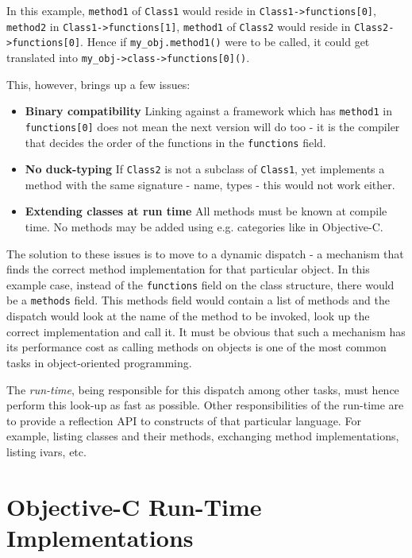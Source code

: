 In this example, \verb=method1= of \verb=Class1= would reside in \verb=Class1->functions[0]=, \verb=method2= in \verb=Class1->functions[1]=, \verb=method1= of \verb=Class2= would reside in \newline{}\verb=Class2->functions[0]=. Hence if \verb=my_obj.method1()= were to be called, it could get translated into \verb=my_obj->class->functions[0]()=.

This, however, brings up a few issues:

\begin{itemize}
  \item{\bf{Binary compatibility}} Linking against a framework which has \verb=method1= in \verb=functions[0]= does not mean the next version will do too - it is the compiler that decides the order of the functions in the \verb=functions= field.
  \item{\bf{No duck-typing}} If \verb=Class2= is not a subclass of \verb=Class1=, yet implements a method with the same signature - name, types - this would not work either.
  \item{\bf{Extending classes at run time}} All methods must be known at compile time. No methods may be added using e.g. categories like in Objective-C.
\end{itemize}

The solution to these issues is to move to a dynamic dispatch - a mechanism that finds the correct method implementation for that particular object. In this example case, instead of the \verb=functions= field on the class structure, there would be a \verb=methods= field. This methods field would contain a list of methods and the dispatch would look at the name of the method to be invoked, look up the correct implementation and call it. It must be obvious that such a mechanism has its performance cost as calling methods on objects is one of the most common tasks in object-oriented programming.

The \emph{run-time}, being responsible for this dispatch among other tasks, must hence perform this look-up as fast as possible. Other responsibilities of the run-time are to provide a reflection API to constructs of that particular language. For example, listing classes and their methods, exchanging method implementations, listing ivars, etc.


\section{Objective-C Run-Time Implementations}

